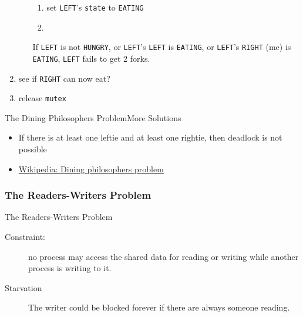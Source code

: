 \begin{enumerate}
\begin{enumerate}
    \begin{enumerate}
    \item set \texttt{LEFT}'s \texttt{state} to \texttt{EATING}
    \item {} 
    \end{enumerate}
  \item [If] \texttt{LEFT} is not \texttt{HUNGRY}, or \texttt{LEFT}'s \texttt{LEFT} is
    \texttt{EATING}, or \texttt{LEFT}'s \texttt{RIGHT} (me) is \texttt{EATING}, \texttt{LEFT} fails
    to get 2 forks.
  \end{enumerate}
\item {} see if \texttt{RIGHT} can now eat?
\item release \texttt{mutex}
\end{enumerate}

\begin{frame}{The Dining Philosophers Problem}{More Solutions}
  \begin{itemize}
  \item If there is at least one leftie and at least one rightie, then
      deadlock is not possible
  \item \href{http://en.wikipedia.org/wiki/Dining_philosophers_problem}{Wikipedia: Dining
      philosophers problem}
  \end{itemize}
\end{frame}

\subsubsection{The Readers-Writers Problem}

\begin{frame}{The Readers-Writers Problem}
  \begin{description}
  \item[Constraint:] no process may access the shared data for reading or writing while
    another process is writing to it.
  \end{description}
  \begin{center}
  \end{center}
  \pause
  \begin{description}
  \item[Starvation] The writer could be blocked forever if there are always someone
    reading.
  \end{description}
\end{frame}

